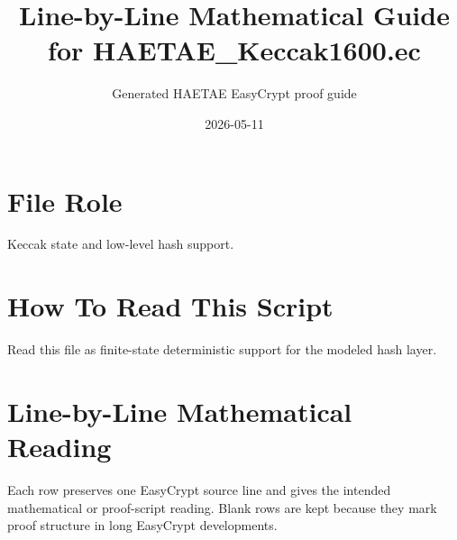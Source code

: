 \documentclass[10pt]{article}
\title{Line-by-Line Mathematical Guide for HAETAE\_Keccak1600.ec}
\author{Generated HAETAE EasyCrypt proof guide}
\date{2026-05-11}
\begin{document}
\maketitle

\section*{File Role}
Keccak state and low-level hash support.

\section*{How To Read This Script}
Read this file as finite-state deterministic support for the modeled hash layer.

\section*{Line-by-Line Mathematical Reading}
Each row preserves one EasyCrypt source line and gives the intended mathematical
or proof-script reading.  Blank rows are kept because they mark proof structure
in long EasyCrypt developments.
\end{document}
